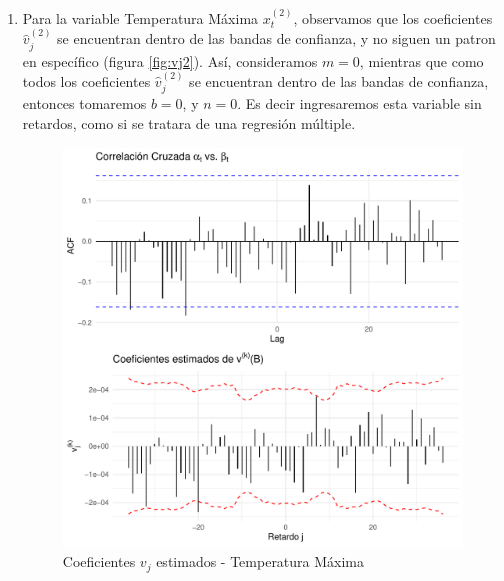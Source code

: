 \documentclass[12pt,oneside]{book}\usepackage[]{graphicx}\usepackage[]{color}
\makeatletter
\def\maxwidth{ %
  \ifdim\Gin@nat@width>\linewidth
    \linewidth
  \else
    \Gin@nat@width
  \fi
}
\newenvironment{knitrout}{}{} %
\theoremstyle{definition} %
\makeatother
\begin{document}
\begin{enumerate}
\begin{knitrout}
\end{knitrout}



\item Para la variable Temperatura Máxima $x_t^{(2)}$, observamos que los coeficientes $\hat v_j^{(2)}$ se encuentran dentro de las bandas de confianza, y no siguen un patron en específico (figura \ref{fig:vj2}). Así, consideramos $m=0$, mientras que como todos los coeficientes $\hat v_j^{(2)}$ se encuentran dentro de las bandas de confianza, entonces tomaremos $b=0$, y $n=0$. Es decir ingresaremos esta variable sin retardos, como si se tratara de una regresión múltiple.




\begin{knitrout}
\color{fgcolor}\begin{figure}[H]

{\centering \includegraphics[width=\maxwidth]{figure/unnamed-chunk-41-1} 

}

\caption{\label{fig:vj2} Coeficientes $v_j$ estimados - Temperatura Máxima}\label{fig:unnamed-chunk-41}
\end{figure}


\end{knitrout}



\end{enumerate}
\end{document}
